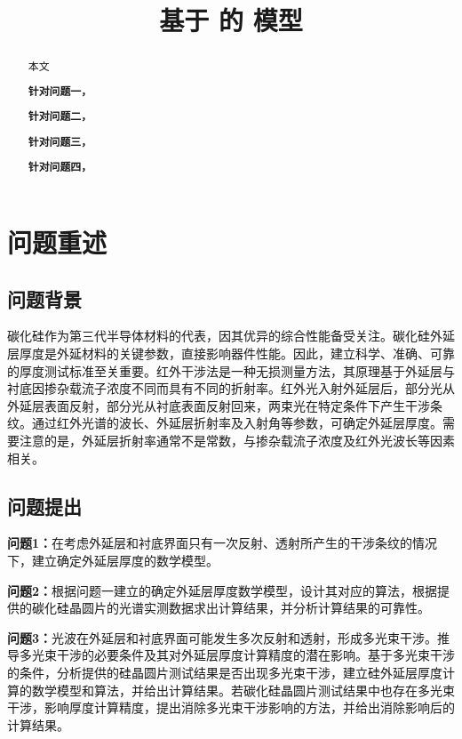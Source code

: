 \documentclass[withoutpreface,bwprint]{cumcmthesis} %
\title{基于 的 模型}
\begin{document}
\maketitle
\nocite{*}


\begin{abstract}
本文

    \textbf{针对问题一，}

    \textbf{针对问题二，}

    \textbf{针对问题三，}

    \textbf{针对问题四，}

\end{abstract}

\section{问题重述}

\subsection{问题背景}
碳化硅作为第三代半导体材料的代表，因其优异的综合性能备受关注。碳化硅外延层厚度是外延材料的关键参数，直接影响器件性能。因此，建立科学、准确、可靠的厚度测试标准至关重要。红外干涉法是一种无损测量方法，其原理基于外延层与衬底因掺杂载流子浓度不同而具有不同的折射率。红外光入射外延层后，部分光从外延层表面反射，部分光从衬底表面反射回来，两束光在特定条件下产生干涉条纹。通过红外光谱的波长、外延层折射率及入射角等参数，可确定外延层厚度。需要注意的是，外延层折射率通常不是常数，与掺杂载流子浓度及红外光波长等因素相关。

\subsection{问题提出}

\textbf{问题1：}在考虑外延层和衬底界面只有一次反射、透射所产生的干涉条纹的情况下，建立确定外延层厚度的数学模型。

\textbf{问题2：}根据问题一建立的确定外延层厚度数学模型，设计其对应的算法，根据提供的碳化硅晶圆片的光谱实测数据求出计算结果，并分析计算结果的可靠性。

\textbf{问题3：}光波在外延层和衬底界面可能发生多次反射和透射，形成多光束干涉。推导多光束干涉的必要条件及其对外延层厚度计算精度的潜在影响。基于多光束干涉的条件，分析提供的硅晶圆片测试结果是否出现多光束干涉，建立硅外延层厚度计算的数学模型和算法，并给出计算结果。若碳化硅晶圆片测试结果中也存在多光束干涉，影响厚度计算精度，提出消除多光束干涉影响的方法，并给出消除影响后的计算结果。
\end{document}
